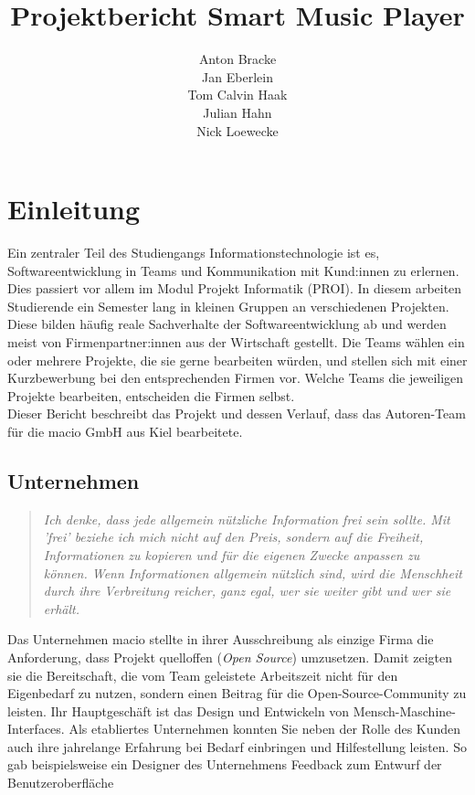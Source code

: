 \documentclass[10pt, a4paper]{article}
\title{Projektbericht Smart Music Player}
\author{Anton Bracke\\Jan Eberlein\\Tom Calvin Haak\\Julian Hahn\\Nick Loewecke}
\begin{document}
\maketitle
\newpage
\tableofcontents
\newpage



\section{Einleitung}
Ein zentraler Teil des Studiengangs \glqq Informationstechnologie\grqq{} ist es, Softwareentwicklung in Teams und Kommunikation mit Kund:innen zu erlernen. \cite{Qualifikationsziele_Informationstechnologie}
Dies passiert vor allem im Modul \glqq Projekt Informatik (PROI)\grqq{}.
In diesem arbeiten Studierende ein Semester lang in kleinen Gruppen an verschiedenen Projekten.
Diese bilden häufig reale Sachverhalte der Softwareentwicklung ab und werden meist von Firmenpartner:innen aus der Wirtschaft gestellt.
Die Teams wählen ein oder mehrere Projekte, die sie gerne bearbeiten würden, und stellen sich mit einer Kurzbewerbung bei den entsprechenden Firmen vor.
Welche Teams die jeweiligen Projekte bearbeiten, entscheiden die Firmen selbst.
\\
Dieser Bericht beschreibt das Projekt und dessen Verlauf, dass das Autoren-Team für die macio GmbH aus Kiel bearbeitete.

\subsection{Unternehmen}
\begin{quote}
  \textit{Ich denke, dass jede allgemein nützliche Information frei sein sollte. Mit 'frei' beziehe ich mich nicht auf den Preis, sondern auf die Freiheit, Informationen zu kopieren und für die eigenen Zwecke anpassen zu können. Wenn Informationen allgemein nützlich sind, wird die Menschheit durch ihre Verbreitung reicher, ganz egal, wer sie weiter gibt und wer sie erhält.}
  \cite{openSource}
\end{quote}

Das Unternehmen macio stellte in ihrer Ausschreibung als einzige Firma die Anforderung, dass Projekt quelloffen (\textit{Open Source}) umzusetzen. Damit zeigten sie die Bereitschaft, die vom Team geleistete Arbeitszeit nicht für den Eigenbedarf zu nutzen, sondern einen Beitrag für die Open-Source-Community zu leisten.
Ihr Hauptgeschäft ist das Design und Entwickeln von Mensch-Maschine-Interfaces. Als etabliertes Unternehmen konnten Sie neben der Rolle des Kunden auch ihre jahrelange Erfahrung bei Bedarf einbringen und Hilfestellung leisten. So gab beispielsweise ein Designer des Unternehmens Feedback zum Entwurf der Benutzeroberfläche
\end{document}
